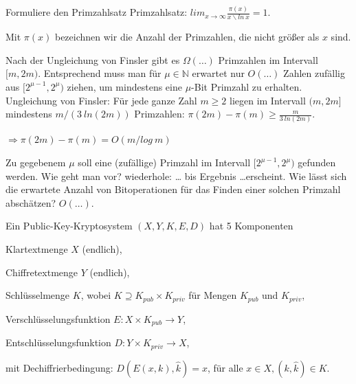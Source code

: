 \documentclass[avery5371, frame]{flashcards}
\begin{document}
\begin{flashcard}[Primzahlen]{Formuliere den Primzahlsatz}
    Primzahlsatz: $lim_{x\rightarrow \infty} \frac{\pi(x)}{x\backslash ln\ x}= 1$.

    Mit $\pi(x)$ bezeichnen wir die Anzahl der Primzahlen, die nicht größer als $x$ sind.
\end{flashcard}

\begin{flashcard}[Primzahlen]{Nach der Ungleichung von Finsler gibt es $\Omega(\dots)$ Primzahlen im Intervall $[m, 2m)$. Entsprechend muss man für $\mu\in\mathbb{N}$ erwartet nur $O(\dots)$ Zahlen zufällig aus $[2^{\mu-1}, 2^{\mu})$ ziehen, um mindestens eine $\mu$-Bit Primzahl zu erhalten.}
                    Ungleichung von Finsler: Für jede ganze Zahl $m\geq 2$ liegen im Intervall $(m, 2m]$ mindestens $m/(3\ ln(2m))$ Primzahlen: $\pi (2m)-\pi(m)\geq \frac{m}{3\ ln(2m)}$.

    $\Rightarrow \pi(2m)-\pi(m) = O(m/log\ m)$
\end{flashcard}

\begin{flashcard}[Primzahlen]{Zu gegebenem $\mu$ soll eine (zufällige) Primzahl im Intervall $[2^{\mu-1}, 2^{\mu})$ gefunden werden. Wie geht man vor?}
    wiederhole: \dots
    bis Ergebnis \dots erscheint.
    Wie lässt sich die erwartete Anzahl von Bitoperationen für das Finden einer solchen Primzahl abschätzen? $O(\dots)$.
\end{flashcard}

\begin{flashcard}{Ein Public-Key-Kryptosystem $(X,Y,K,E,D)$ hat 5 Komponenten}
    \begin{itemize*}
        \item Klartextmenge $X$ (endlich),
        \item Chiffretextmenge $Y$ (endlich),
        \item Schlüsselmenge $K$, wobei $K\supseteq K_{pub} \times K_{priv}$ für Mengen $K_{pub}$ und $K_{priv}$,
        \item Verschlüsselungsfunktion $E:X\times K_{pub} \rightarrow Y$,
        \item Entschlüsselungsfunktion $D:Y\times K_{priv} \rightarrow X$,
        \item mit Dechiffrierbedingung: $D(E(x,k), \hat{k}) =x$, für alle $x\in X,(k,\hat{k})\in K$.
    \end{itemize*}
\end{flashcard}
\end{document}
